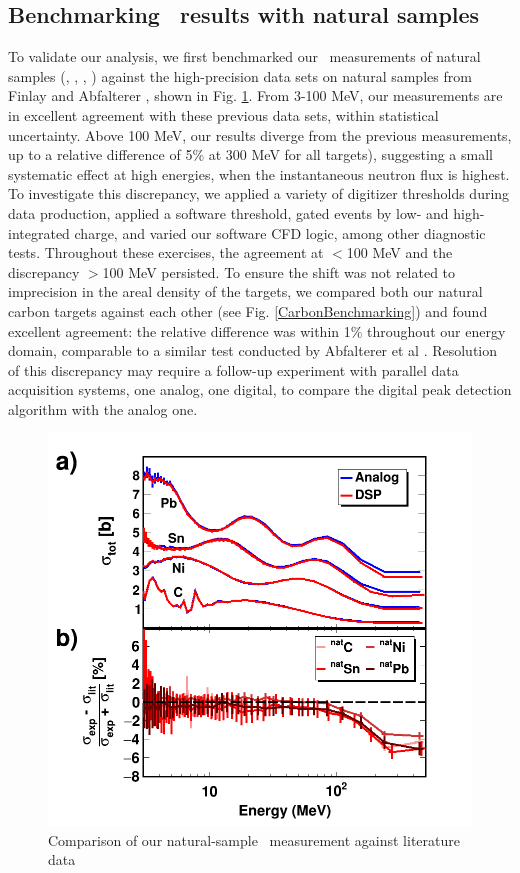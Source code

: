\subsection{Benchmarking \tot\ results with natural samples}
To validate our analysis, we first benchmarked our \tot\ measurements of natural samples
(\cNat, \niNat, \snNat, \pbNat) against the high-precision data sets on natural samples from Finlay
\cite{Finlay1993} and Abfalterer \cite{Abfalterer2001}, shown in Fig.
\ref{LiteratureBenchmarking}. From 3-100 MeV, our measurements are in excellent agreement with 
these previous data sets, within statistical uncertainty. Above 100 MeV, our results diverge
from the previous measurements, up to a relative difference of 5\% at 300 MeV for all targets), 
suggesting a small 
systematic effect at high energies, when the instantaneous neutron flux is highest. To investigate
this discrepancy, we applied a variety of digitizer thresholds during data production, applied a 
software threshold, gated events by low- and high-integrated charge, and varied our software CFD 
logic, among other diagnostic tests. Throughout these exercises, the agreement at $<$100 MeV and the 
discrepancy $>$100 MeV persisted. To ensure the shift was not related to imprecision in the areal
density of the targets, we compared both our natural carbon targets against each other (see Fig.
\ref{CarbonBenchmarking}) and found excellent agreement: the relative difference
was within 1\% throughout our energy domain, comparable to a similar test conducted by Abfalterer et
al \cite{Abfalterer2001}. Resolution of this discrepancy may require a follow-up experiment with 
parallel data acquisition systems, one analog, one digital, to compare the digital peak detection
algorithm with the analog one.

\begin{figure}
    \includegraphics[scale=0.5]{figures/literatureBenchmarking.png}
    \caption{Comparison of our natural-sample \tot\ measurement against literature data}
    \label{LiteratureBenchmarking}
\end{figure}

